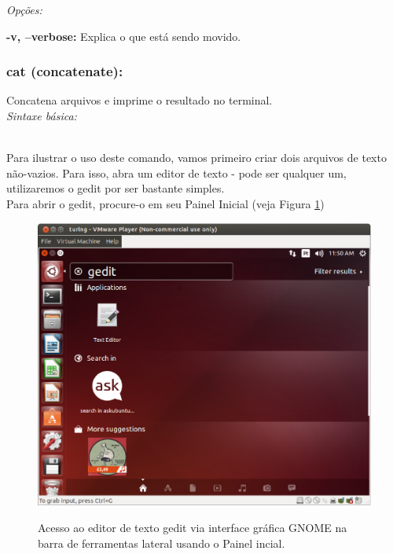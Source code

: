 \begin{refsection}
\textit{Opções:}

 \textbf{-v, --verbose:} Explica o que está sendo movido.\\

\subsubsection{cat (concatenate):}\label{tut1:text:mode:commands:cat}

 Concatena arquivos e imprime o resultado no terminal.\\

\textit{Sintaxe básica:}

 \\
Para ilustrar o uso deste comando, vamos primeiro criar dois arquivos de texto não-vazios. Para isso, abra um editor de texto - pode ser qualquer um, utilizaremos o gedit por ser bastante simples.\\
 Para abrir o gedit, procure-o em seu Painel Inicial (veja Figura \ref{tut1:fig:gedit})

  \begin{figure}[H]
      {\includegraphics[scale=0.35]{figures/tut1/gedit.eps}}
      {\caption[\textit{Acesso ao gedit via interface gráfica GNOME usando o Painel incial}]{Acesso ao editor de texto gedit via interface gráfica GNOME na barra de ferramentas lateral  usando o Painel incial.}\label{tut1:fig:gedit}}
  \end{figure}


\end{refsection}

